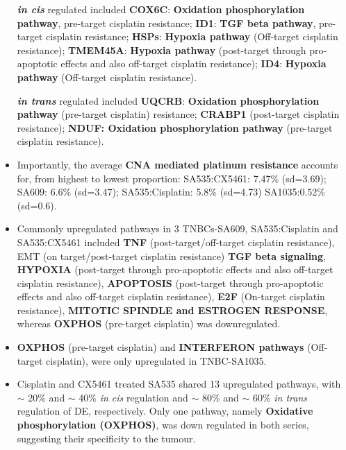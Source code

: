 \begin{itemize}
 \textbf{\textit{in cis}} regulated included \textbf{COX6C}: \textbf{Oxidation phosphorylation pathway}, pre-target cisplatin resistance; \textbf{ID1}: \textbf{TGF beta pathway}, pre-target cisplatin resistance; \textbf{HSPs}: \textbf{Hypoxia pathway} (Off-target cisplatin resistance);  \textbf{TMEM45A}: \textbf{Hypoxia pathway} (post-target through pro-apoptotic effects and also off-target cisplatin resistance); \textbf{ID4}: \textbf{Hypoxia pathway} (Off-target cisplatin resistance).  

   \textbf{\textit{in trans}} regulated included  \textbf{UQCRB}: \textbf{Oxidation phosphorylation pathway} (pre-target cisplatin) resistance;  \textbf{CRABP1} (post-target cisplatin resistance); \textbf{NDUF: Oxidation phosphorylation pathway} (pre-target cisplatin resistance). 

 \item Importantly, the average \textbf{CNA mediated platinum resistance} accounts for, from highest to lowest proportion: SA535:CX5461: 7.47\% (sd=3.69); 
SA609: 6.6\% (sd=3.47); SA535:Cisplatin: 5.8\% (sd=4.73)
SA1035:0.52\% (sd=0.6). 
 
  \item Commonly upregulated pathways in 3 TNBCs-SA609, SA535:Cisplatin and SA535:CX5461 included \textbf{TNF} (post-target/off-target cisplatin resistance), EMT (on target/post-target cisplatin resistance) \textbf{TGF  beta  signaling},  \textbf{HYPOXIA} (post-target through pro-apoptotic effects and also off-target cisplatin resistance), \textbf{APOPTOSIS} (post-target through pro-apoptotic effects and also off-target cisplatin resistance), \textbf{E2F} (On-target cisplatin resistance), \textbf{MITOTIC SPINDLE and ESTROGEN  RESPONSE}, whereas \textbf{OXPHOS} (pre-target cisplatin) was downregulated. 
 
 \item \textbf{OXPHOS} (pre-target cisplatin) and \textbf{INTERFERON pathways} (Off-target cisplatin), were only upregulated in TNBC-SA1035.
 
 \item Cisplatin and CX5461 treated SA535 shared 13 upregulated pathways, with $\sim$ 20\% and $\sim$ 40\% \textit{in cis} regulation and $\sim$ 80\% and $\sim$ 60\% \textit{in trans} regulation of DE, respectively. Only one pathway, namely \textbf{Oxidative phosphorylation (OXPHOS)}, was down regulated in both series, suggesting their specificity to the tumour.

\end{itemize}

